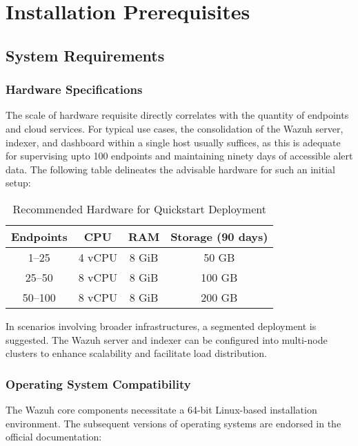 \newpage
\section{Installation Prerequisites}
\subsection{System Requirements}
\subsubsection{Hardware Specifications}

The scale of hardware requisite directly correlates with the quantity of endpoints and cloud services. For typical use cases, the consolidation of the Wazuh server, indexer, and dashboard within a single host usually suffices, as this is adequate for supervising upto 100 endpoints and maintaining ninety days of accessible alert data. The following table delineates the advisable hardware for such an initial setup:

\begin{table}[H]
\centering
\begin{tabular}{|c|c|c|c|}
\hline
\textbf{Endpoints} & \textbf{CPU} & \textbf{RAM} & \textbf{Storage (90 days)} \\ \hline
1–25      & 4 vCPU    & 8 GiB & 50 GB             \\ \hline
25–50     & 8 vCPU    & 8 GiB & 100 GB            \\ \hline
50–100    & 8 vCPU    & 8 GiB & 200 GB            \\ \hline
\end{tabular}
\caption{Recommended Hardware for Quickstart Deployment}
\label{table:hardware_req}
\end{table}


In scenarios involving broader infrastructures, a segmented deployment is suggested. The Wazuh server and indexer can be configured into multi-node clusters to enhance scalability and facilitate load distribution.

\subsubsection{Operating System Compatibility}

The Wazuh core components necessitate a 64-bit Linux-based installation environment. The subsequent versions of operating systems are endorsed in the official documentation:

